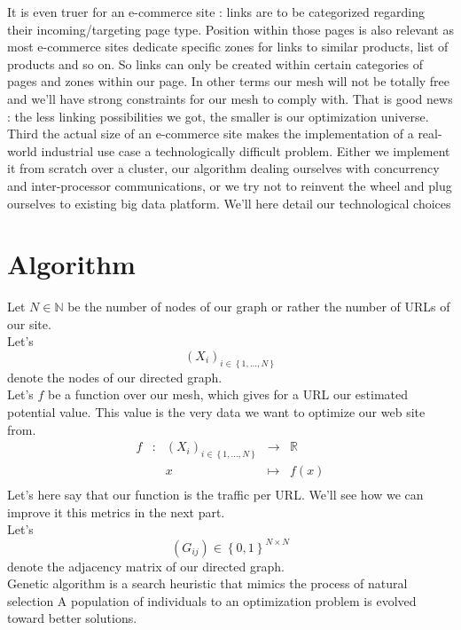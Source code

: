 \documentclass{iSWAGArticle}
\begin{document}
It is even truer for an e-commerce site : links are to be categorized regarding their incoming/targeting page type. Position within those pages
is also relevant as most e-commerce sites dedicate specific zones for links to similar products, list of products and so on.
So links can only be created within certain categories of pages and zones within our page. In other terms our mesh will not be totally free and 
we'll have strong constraints for our mesh to comply with. That is good news : the less linking possibilities we got, the smaller is our optimization universe.
\\
\indent
Third the actual size of an e-commerce site makes the implementation of a real-world industrial use case a technologically difficult problem.
Either we implement it from scratch over a cluster, our algorithm dealing ourselves with concurrency and inter-processor communications,
or we try not to reinvent the wheel and plug ourselves to existing big data platform. We'll here detail our technological choices
\section{Algorithm}
Let $N \in \mathbb{N}$ be the number of nodes of our graph or rather the number of URLs of our site.
 \\\newline
Let's $$\left(X_i\right)_{i \in \left\{1,...,N\right\}}$$ denote the nodes of our directed graph.
 \\\newline
Let's $f$ be a function over our mesh, which gives for a URL our estimated potential value. This value is the
very data we want to optimize our web site from.
\begin{equation}
\begin{array}{ccccc}
f & : & \left(X_i\right)_{i \in \left\{1,...,N\right\}} & \to & \mathbb{R} \\
 & & x & \mapsto & f(x) \\
\end{array}
\end{equation}
Let's here say that our function is the traffic per URL. We'll see how we can improve it this metrics in the next part.
 \\\newline
Let's $$\left(G_{ij}\right)  \in \left\{0,1\right\}^{N\times N}$$ denote the adjacency matrix of our directed graph.
 \\\newline
Genetic algorithm is a search heuristic that mimics the process of natural selection 
A population of individuals to an optimization problem is evolved toward better solutions. 
\end{document}
